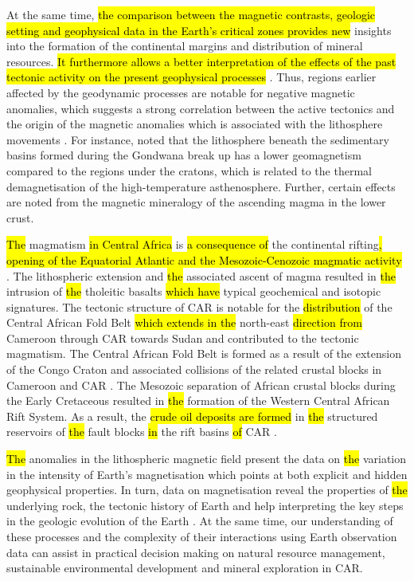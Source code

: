 \documentclass[minerals,article,submit,pdftex,moreauthors]{Definitions/mdpi}
\begin{document}
At the same time, \hl{the comparison between the magnetic contrasts, geologic setting and geophysical data in the Earth's critical zones provides new} insights into the formation of the continental margins and distribution of mineral resources. \hl{It furthermore allows a better interpretation of the effects of the past tectonic activity on the present geophysical processes} \cite{FELIXTOTEU2002906}. Thus, regions earlier affected by the geodynamic processes are notable for negative magnetic anomalies, which suggests a strong correlation between the active tectonics and the origin of the magnetic anomalies which is associated with the lithosphere movements \cite{RAVAT199259}. For instance, \cite{ARKANIHAMED1985257} noted that the lithosphere beneath the sedimentary basins formed during the Gondwana break up has a lower geomagnetism compared to the regions under the cratons, which is related to the thermal demagnetisation of the high-temperature asthenosphere. Further, certain effects are noted from the magnetic mineralogy of the ascending magma in the lower crust.

\hl{The} magmatism \hl{in Central Africa }is \hl{a consequence of }the continental rifting\hl{, opening of the Equatorial Atlantic and the Mesozoic-Cenozoic magmatic activity} \cite{WILSON1992203}. The lithospheric extension and \hl{the }associated ascent of magma resulted in \hl{the }intrusion of \hl{the }tholeitic basalts \hl{which have} typical geochemical and isotopic signatures. The tectonic structure of \hl{ }CAR is notable for the \hl{distribution} of the Central African Fold Belt \hl{which extends in the } north-east \hl{direction from }Cameroon through CAR towards Sudan and contributed to the tectonic magmatism. The Central African Fold Belt is formed as a result of the extension of the Congo Craton and associated collisions\hl{ }of the related crustal blocks in Cameroon and CAR \cite{TOTEU2022296}. The Mesozoic separation of African crustal blocks during the Early Cretaceous resulted in \hl{the }formation of the Western Central African Rift System. As a result, the \hl{crude oil deposits are formed }in \hl{the }structured reservoirs of \hl{the }fault blocks \hl{in} the rift basins \hl{of} CAR \cite{GENIK1992169}.

\hl{The }anomalies in the lithospheric magnetic field present the data on \hl{the }variation in the intensity of Earth's magnetisation which points at both explicit and hidden geophysical properties. In turn, data on magnetisation reveal\hl{ }the properties of \hl{the }underlying rock, the tectonic history of Earth and help interpreting the key steps in the geologic evolution of the Earth \cite{Vervelidou}. At the same time, our understanding of these processes and the complexity of their interactions using Earth observation data can assist in practical decision making on natural resource management, sustainable environmental development and mineral exploration in CAR. 
\end{document}
